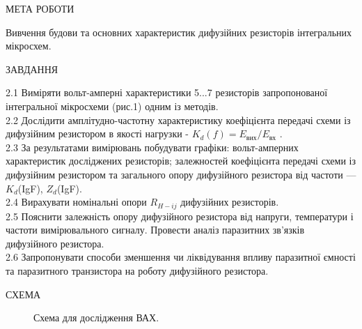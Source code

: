 \documentclass[a4paper,14pt]{extreport}
\begin{document}
\begin{center} МЕТА РОБОТИ\\ \end{center}

Вивчення будови та основних характеристик дифузійних резисторів інтегральних
мікросхем.

\begin{center} ЗАВДАННЯ\\ \end{center}\par

2.1 Виміряти вольт-амперні характеристики 5...7 резисторів запропонованої інтегральної
мікросхеми (рис.1) одним із методів.\\

2.2 Дослідити амплітудно-частотну характеристику коефіцієнта передачі схеми із
дифузійним резистором в якості нагрузки - $K_{d}(f)= E_{\text{вих}}/E_{\text{вх}}$ .\\

2.3 За результатами вимірювань побудувати графіки: вольт-амперних характеристик
досліджених резисторів; залежностей коефіцієнта передачі схеми із дифузійним
резистором та загального опору дифузійного резистора від частоти — $K_{d}$(IgF), $Z_{d}$(IgF).\\

2.4 Вирахувати номінальні опори $R_{H-ij}$ дифузійних резисторів.\\


2.5 Пояснити залежність опору дифузійного резистора від напруги, температури і частоти
вимірювального сигналу. Провести аналіз паразитних зв'язків дифузійного резистора.\\

2.6 Запропонувати способи зменшення чи ліквідування впливу паразитної ємності та
паразитного транзистора на роботу дифузійного резистора.

\newpage
\begin{center}СХЕМА \\ \end{center}

\begin{figure}[ht]
\caption{Схема для дослідження ВАХ.}
\label{ris111}
\end{figure}
\newpage
\end{document}
